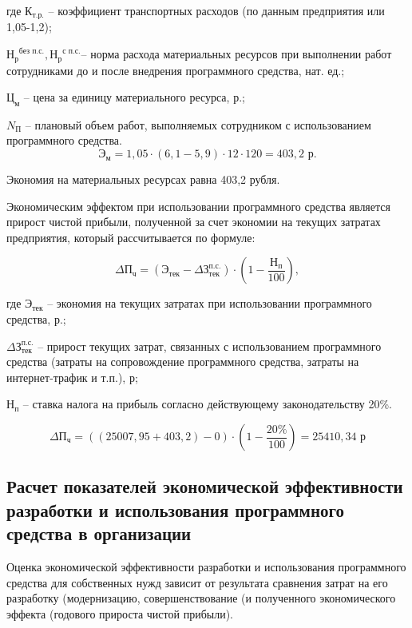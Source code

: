 где $\text{К}_{\text{т.р.}}$ – коэффициент транспортных расходов (по данным предприятия или 1,05-1,2);

${\text{Н}_{\text{р}}}^{\text{без п.с.}}, {\text{Н}_{\text{р}}}^{\text{с п.с.}}$– норма расхода материальных ресурсов при
выполнении работ сотрудниками до и после внедрения программного
средства, нат. ед.;

$\text{Ц}_{\text{м}}$ – цена за единицу материального ресурса, р.;

$N_{\text{П}}$ – плановый объем работ, выполняемых сотрудником с использованием программного средства.
$$
\text{Э}_{\text{м}} = 1,05 \cdot (6,1-5,9) \cdot 12 \cdot 120 = 403,2 \text{ р.}
$$

Экономия на материальных ресурсах равна 403,2 рубля.

Экономическим эффектом при использовании программного средства является прирост чистой прибыли, полученной за счет экономии на текущих затратах предприятия, который рассчитывается по формуле:

\begin{equation}
    \Delta \text{П}_{\text{ч}} = (\text{Э}_{\text{тек}} - \Delta\text{З}_{\text{тек}}^{\text{п.с.}}) \cdot (1-\frac{\text{Н}_{\text{п}}}{100}), 
\end{equation}

где $\text{Э}_{\text{тек}} $ – экономия на текущих затратах при использовании программного средства, р.; 

$\Delta\text{З}_{\text{тек}}^{\text{п.с.}}$ – прирост текущих затрат, связанных с использованием программного средства (затраты на сопровождение программного средства, затраты на 
интернет-трафик и т.п.), р;

$\text{Н}_{\text{п}}$ – ставка налога на прибыль согласно 
действующему законодательству 20\%.

$$
\Delta \text{П}_{\text{ч}} = ((25007,95 + 403,2) -0)\cdot (1-\frac{20\%}{100})=25410,34 \text{ р}
$$

\subsection{Расчет показателей экономической эффективности разработки и использования программного средства в организации}

Оценка экономической эффективности разработки и использования программного средства для собственных нужд зависит от результата сравнения затрат на его разработку (модернизацию, совершенствование (и полученного экономического эффекта (годового прироста чистой прибыли). 

